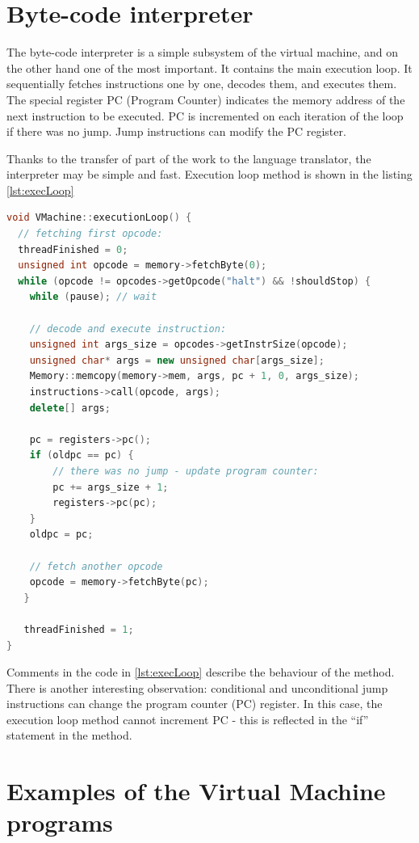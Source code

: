 \documentclass[oneside]{book}
\begin{document}
\section{Byte-code interpreter}

The byte-code interpreter is a simple subsystem of the virtual machine, and on the other hand one of the most important. It contains the main execution loop. It sequentially fetches instructions one by one, decodes them, and executes them. The special register PC (Program Counter) indicates the memory address of the next instruction to be executed. PC is incremented on each iteration of the loop if there was no jump. Jump instructions can modify the PC register.

Thanks to the transfer of part of the work to the language translator, the interpreter may be simple and fast. Execution loop method is shown in the listing \ref{lst:execLoop}

\begin{lstlisting}[caption=Execution loop, label={lst:execLoop}, language=C++, style=customc]
void VMachine::executionLoop() {
  // fetching first opcode:
  threadFinished = 0;
  unsigned int opcode = memory->fetchByte(0);
  while (opcode != opcodes->getOpcode("halt") && !shouldStop) {
    while (pause); // wait

    // decode and execute instruction:
    unsigned int args_size = opcodes->getInstrSize(opcode);
    unsigned char* args = new unsigned char[args_size];
    Memory::memcopy(memory->mem, args, pc + 1, 0, args_size);
    instructions->call(opcode, args);
    delete[] args;

    pc = registers->pc();
    if (oldpc == pc) {
        // there was no jump - update program counter:
        pc += args_size + 1;
        registers->pc(pc);
    }
    oldpc = pc;

    // fetch another opcode
    opcode = memory->fetchByte(pc);
   }

   threadFinished = 1;
}

\end{lstlisting}

Comments in the code in \ref{lst:execLoop} describe the behaviour of the method. There is another interesting observation: conditional and unconditional jump instructions can change the program counter (PC) register. In this case, the execution loop method cannot increment PC - this is reflected in the ``if'' statement in the method.


\section{Examples of the Virtual Machine programs}
\end{document}
